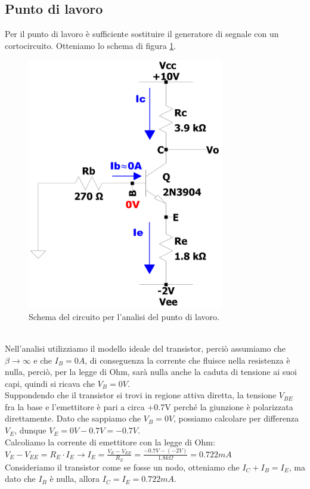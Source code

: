 \documentclass{report}
\begin{document}
\subsection{Punto di lavoro} \label{ptolavCEv2}
Per il punto di lavoro è sufficiente sostituire il generatore di segnale con un cortocircuito. Otteniamo lo schema di figura \ref{figura:CEv2_pl}.
\begin{figure}[h]
\centering
\includegraphics[height=11cm]{immagini/CEv2_pl}
\caption{Schema del circuito per l'analisi del punto di lavoro.}
\label{figura:CEv2_pl}
\end{figure}
\\Nell'analisi utilizziamo il modello ideale del transistor, perciò assumiamo che $\displaystyle{\beta\rightarrow\infty}$ e che $I_{B}=0A$, di conseguenza la corrente che fluisce nella resistenza è nulla, perciò, per la legge di Ohm, sarà nulla anche la caduta di tensione ai suoi capi, quindi si ricava che $V_{B}=0V$. 
\\Suppondendo che il transistor si trovi in regione attiva diretta, la tensione $V_{BE}$ fra la base e l'emettitore è pari a circa +0.7V perché la giunzione è polarizzata direttamente. Dato che sappiamo che $V_{B}=0V$, possiamo calcolare per differenza $V_{E}$, dunque $V_{E}=0V-0.7V=-0.7V$.
\\Calcoliamo la corrente di emettitore con la legge di Ohm: 
\\[2pt]\indent$\displaystyle{V_E-V_{EE}=R_E\cdot I_E \rightarrow I_E=\frac{V_E-V_{EE}}{R_E}=\frac{-0.7V-(-2V)}{1.8k\Omega}=0.722mA}$
\\[2pt]Consideriamo il transistor come se fosse un nodo, otteniamo che $I_C+I_B=I_E$, ma dato che $I_{B}$ è nulla, allora $I_C=I_E=0.722mA$.
\end{document}
